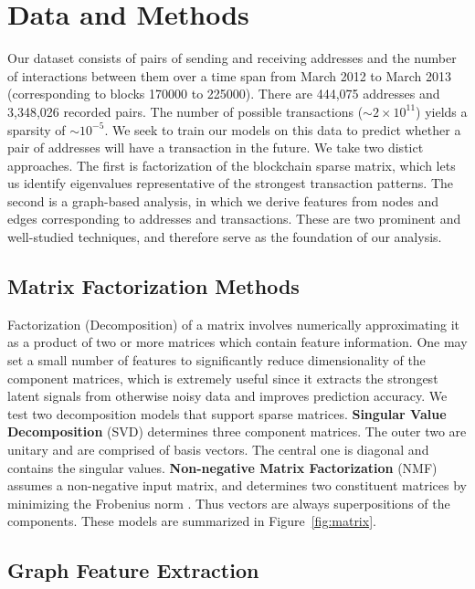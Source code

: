 \documentclass{article} %
\begin{document}
\section{Data and Methods}

Our dataset consists of pairs of sending and receiving addresses and the number of interactions between them over a time span from March 2012 to March 2013 (corresponding to blocks 170000 to 225000). There are 444,075 addresses and 3,348,026 recorded pairs. The number of possible transactions ($\sim 2 \times 10^{11}$) yields a sparsity of $\sim 10^{-5}$. We seek to train our models on this data to predict whether a pair of addresses will have a transaction in the future. We take two distict approaches. The first is factorization of the blockchain sparse matrix, which lets us identify eigenvalues representative of the strongest transaction patterns. The second is a graph-based analysis, in which we derive features from nodes and edges corresponding to addresses and transactions. These are two prominent and well-studied techniques, and therefore serve as the foundation of our analysis.

\subsection{Matrix Factorization Methods}

Factorization (Decomposition) of a matrix involves numerically approximating it as a product of two or more matrices which contain feature information. One may set a small number of features to significantly reduce dimensionality of the component matrices, which is extremely useful since it extracts the strongest latent signals from otherwise noisy data and improves prediction accuracy. We test two decomposition models that support sparse matrices. 
\textbf{Singular Value Decomposition} (SVD) determines three component matrices. The outer two are unitary and are comprised of basis vectors. The central one is diagonal and contains the singular values.
\textbf{Non-negative Matrix Factorization} (NMF) assumes a non-negative input matrix, and determines two constituent matrices by minimizing the Frobenius norm \cite{scikit-learn}. Thus vectors are always superpositions of the components. These models are summarized in Figure~\ref{fig:matrix}.




\subsection{Graph Feature Extraction}
\end{document}
